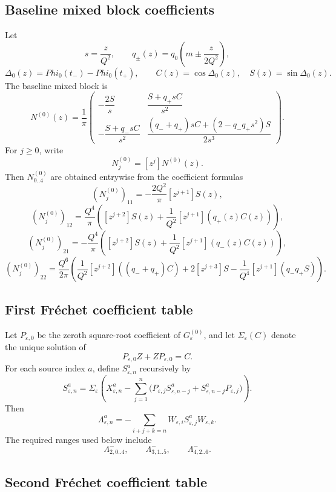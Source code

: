 \documentclass[11pt,a4paper]{amsart}
\def\Phi{Phi}%
\theoremstyle{plain}
\theoremstyle{definition}
\begin{document}
\subsection{Baseline mixed block coefficients}
\label{subsec:baseline-mixed-block-coefficients}

Let
\[
s=\frac{z}{Q^2},\qquad
q_\pm(z)=q_0\left(m\pm\frac{z}{2Q^2}\right),
\]
\[
\Delta_0(z)=\Phi_0(t_-)-\Phi_0(t_+),
\qquad
C(z)=\cos\Delta_0(z),\quad S(z)=\sin\Delta_0(z).
\]
The baseline mixed block is
\[
N^{(0)}(z)=\frac1\pi
\begin{pmatrix}
-\dfrac{2S}{s}
&
\dfrac{S+q_+sC}{s^2}
\\[1.4ex]
-\dfrac{S+q_-sC}{s^2}
&
\dfrac{(q_-+q_+)sC+(2-q_-q_+s^2)S}{2s^3}
\end{pmatrix}.
\]
For \(j\ge0\), write
\[
N^{(0)}_j=[z^j]N^{(0)}(z).
\]
Then \(N^{(0)}_{0..4}\) are obtained entrywise from the coefficient formulas
\[
(N^{(0)}_j)_{11}
=
-\frac{2Q^2}{\pi}[z^{j+1}]S(z),
\]
\[
(N^{(0)}_j)_{12}
=
\frac{Q^4}{\pi}
\left(
[z^{j+2}]S(z)
+
\frac1{Q^2}[z^{j+1}](q_+(z)C(z))
\right),
\]
\[
(N^{(0)}_j)_{21}
=
-\frac{Q^4}{\pi}
\left(
[z^{j+2}]S(z)
+
\frac1{Q^2}[z^{j+1}](q_-(z)C(z))
\right),
\]
\[
(N^{(0)}_j)_{22}
=
\frac{Q^6}{2\pi}
\left(
\frac1{Q^2}[z^{j+2}]((q_-+q_+)C)
+
2[z^{j+3}]S
-
\frac1{Q^4}[z^{j+1}](q_-q_+S)
\right).
\]

\subsection{First Fr\'echet coefficient table}
\label{subsec:first-frechet-coefficient-table}

Let \(P_{\varepsilon,0}\) be the zeroth square-root coefficient of
\(G_\varepsilon^{(0)}\), and let \(\Sigma_\varepsilon(C)\) denote the unique
solution of
\[
P_{\varepsilon,0}Z+ZP_{\varepsilon,0}=C.
\]
For each source index \(a\), define \(S_{\varepsilon,n}^a\) recursively by
\[
S_{\varepsilon,n}^a
=
\Sigma_\varepsilon
\left(
X_{\varepsilon,n}^a
-
\sum_{j=1}^{n}
\bigl(
P_{\varepsilon,j}S_{\varepsilon,n-j}^a
+
S_{\varepsilon,n-j}^aP_{\varepsilon,j}
\bigr)
\right).
\]
Then
\[
\Lambda_{\varepsilon,n}^{a}
=
-\sum_{i+j+k=n}
W_{\varepsilon,i}S_{\varepsilon,j}^aW_{\varepsilon,k}.
\]
The required ranges used below include
\[
\Lambda^-_{2,0..4},\qquad
\Lambda^-_{3,1..5},\qquad
\Lambda^-_{4,2..6}.
\]

\subsection{Second Fr\'echet coefficient table}
\label{subsec:second-frechet-coefficient-table}
\end{document}
